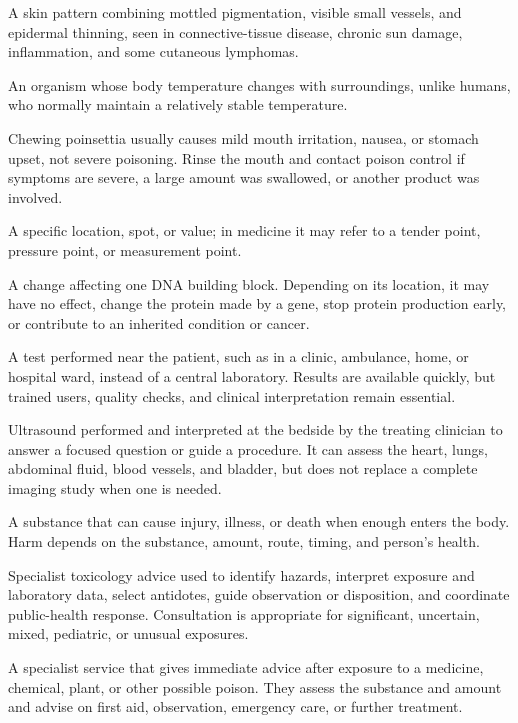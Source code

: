  A skin pattern combining mottled pigmentation, visible small vessels, and epidermal thinning, seen in connective-tissue disease, chronic sun damage, inflammation, and some cutaneous lymphomas.

 An organism whose body temperature changes with surroundings, unlike humans, who normally maintain a relatively stable temperature.

 Chewing poinsettia usually causes mild mouth irritation, nausea, or stomach upset, not severe poisoning. Rinse the mouth and contact poison control if symptoms are severe, a large amount was swallowed, or another product was involved.

 A specific location, spot, or value; in medicine it may refer to a tender point, pressure point, or measurement point.

 A change affecting one DNA building block. Depending on its location, it may have no effect, change the protein made by a gene, stop protein production early, or contribute to an inherited condition or cancer.

 A test performed near the patient, such as in a clinic, ambulance, home, or hospital ward, instead of a central laboratory. Results are available quickly, but trained users, quality checks, and clinical interpretation remain essential.

 Ultrasound performed and interpreted at the bedside by the treating clinician to answer a focused question or guide a procedure. It can assess the heart, lungs, abdominal fluid, blood vessels, and bladder, but does not replace a complete imaging study when one is needed.

 A substance that can cause injury, illness, or death when enough enters the body. Harm depends on the substance, amount, route, timing, and person's health.

 Specialist toxicology advice used to identify hazards, interpret exposure and laboratory
data, select antidotes, guide observation or disposition, and coordinate public-health
response. Consultation is appropriate for significant, uncertain, mixed, pediatric, or
unusual exposures.

 A specialist service that gives immediate advice after exposure to a medicine, chemical, plant, or other possible poison. They assess the substance and amount and advise on first aid, observation, emergency care, or further treatment.

